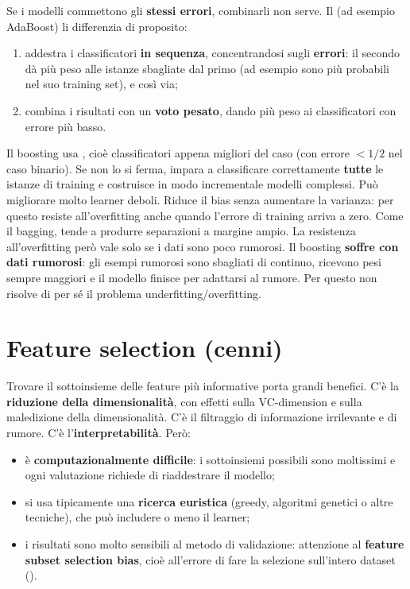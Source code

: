 Se i modelli commettono gli \textbf{stessi errori}, combinarli non serve. Il  (ad esempio
AdaBoost) li differenzia di proposito:
\begin{enumerate}
  \item addestra i classificatori \textbf{in sequenza}, concentrandosi sugli \textbf{errori}: il secondo dà più
        peso alle istanze sbagliate dal primo (ad esempio sono più probabili nel suo training set), e così via;
  \item combina i risultati con un \textbf{voto pesato}, dando più peso ai classificatori con errore più basso.
\end{enumerate}
Il boosting usa , cioè classificatori appena migliori del caso (con errore $<1/2$ nel caso
binario). Se non lo si ferma, impara a classificare correttamente \textbf{tutte} le istanze di training e
costruisce in modo incrementale modelli complessi. Può migliorare molto learner deboli. Riduce il bias senza
aumentare la varianza: per questo resiste all'overfitting anche quando l'errore di training arriva a zero. Come il
bagging, tende a produrre separazioni a margine ampio. La resistenza all'overfitting però vale solo se i dati sono
poco rumorosi. Il boosting \textbf{soffre con dati rumorosi}: gli esempi rumorosi sono sbagliati di continuo,
ricevono pesi sempre maggiori e il modello finisce per adattarsi al rumore. Per questo non risolve di per sé il
problema underfitting/overfitting.

\section{Feature selection (cenni)}
\label{sec:feature-selection}

Trovare il sottoinsieme delle feature più informative porta grandi benefici. C'è la \textbf{riduzione della
dimensionalità}, con effetti sulla VC-dimension e sulla maledizione della dimensionalità. C'è il filtraggio di
informazione irrilevante e di rumore. C'è l'\textbf{interpretabilità}. Però:
\begin{itemize}
  \item è \textbf{computazionalmente difficile}: i sottoinsiemi possibili sono moltissimi e ogni valutazione
        richiede di riaddestrare il modello;
  \item si usa tipicamente una \textbf{ricerca euristica} (greedy, algoritmi genetici o altre tecniche), che può
        includere o meno il learner;
  \item i risultati sono molto sensibili al metodo di validazione: attenzione al \textbf{feature subset
        selection bias}, cioè all'errore di fare la selezione sull'intero dataset ().
\end{itemize}

